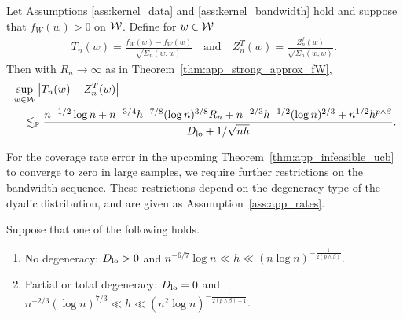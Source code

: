 \begin{lemma}
  \label{lem:infeasible_t_statistic}

  Let Assumptions \ref{ass:kernel_data} and
  \ref{ass:kernel_bandwidth}
  hold and suppose that
  $f_W(w) > 0$ on $\mathcal{W}$.
  Define for $w \in \mathcal{W}$
  \begin{align*}
    T_n(w) = \frac{\hat f_W(w) - f_W(w)}{\sqrt{\Sigma_n(w,w)}}
    \quad\text{and}\quad
    Z_n^T(w) = \frac{Z_n^f(w)}{\sqrt{\Sigma_n(w,w)}}.
  \end{align*}
  Then with $R_n \to \infty$ as in
  Theorem~\ref{thm:app_strong_approx_fW},
  \begin{align*}
    &\sup_{w \in \mathcal{W}} \left| T_n(w) - Z_n^T(w) \right| \\
    &\quad\lesssim_{\mathbb{P}}
    \frac{
      n^{-1/2} \log n
      + n^{-3/4} h^{-7/8} (\log n)^{3/8} R_n
      + n^{-2/3} h^{-1/2} (\log n)^{2/3}
    + n^{1/2} h^{p \wedge \beta}}
    {D_{\textup{lo}} + 1/\sqrt{n h}}.
  \end{align*}

\end{lemma}

For the coverage rate error
in the upcoming Theorem~\ref{thm:app_infeasible_ucb}
to converge to zero in large samples,
we require further restrictions on the bandwidth sequence.
These restrictions depend on the degeneracy type
of the dyadic distribution,
and are given as Assumption~\ref{ass:app_rates}.

\begin{assumption}
  \label{ass:app_rates}

  Suppose that one of the following holds.

  \begin{enumerate}[label=(\roman*)]

    \item
      No degeneracy:
      $D_{\textup{lo}} > 0$ and
      $n^{-6/7} \log n \ll h
      \ll (n \log n)^{-\frac{1}{2(p \wedge \beta)}}$.

    \item
      Partial or total degeneracy:
      $D_{\textup{lo}} = 0$ and
      $n^{-2/3} (\log n)^{7/3} \ll h
      \ll (n^2 \log n)^{-\frac{1}{2(p \wedge \beta) + 1}}$.

  \end{enumerate}

\end{assumption}

